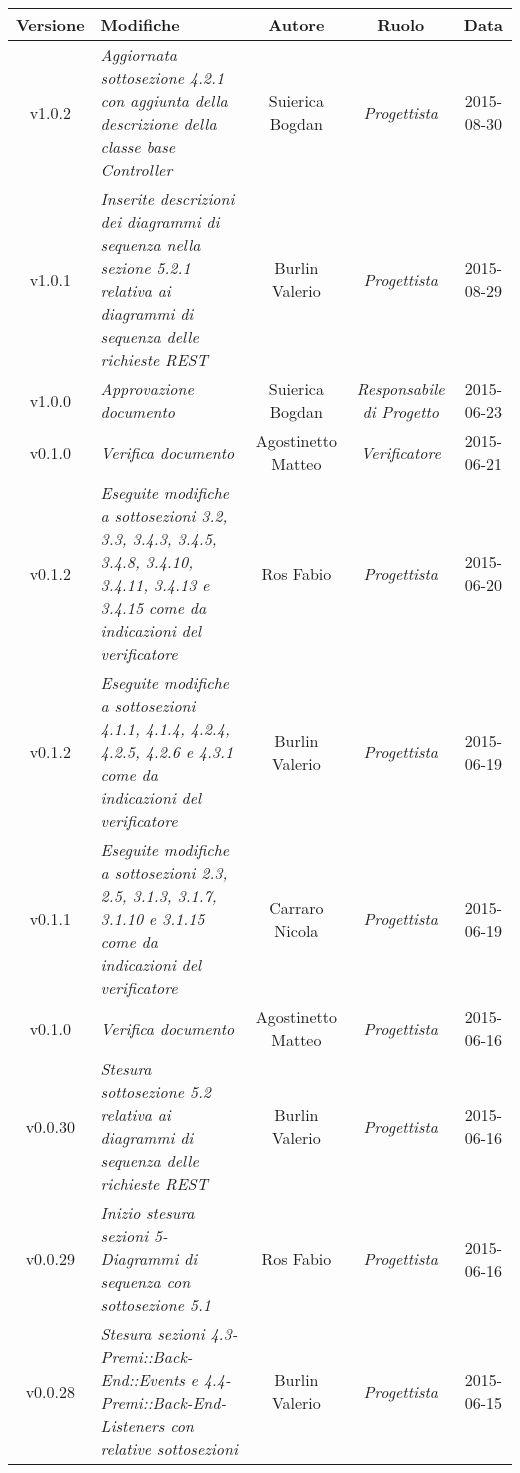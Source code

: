 \newpage

\begin{table}[h]
\centering
\begin{tabular}{|c|p{}|c|c|c|}
	\toprule
		\textbf{Versione} & \textbf{Modifiche} & \textbf{Autore} & \textbf{Ruolo} & \textbf{Data}\\
	\midrule
	\midrule
		v1.0.2 & \textit{Aggiornata sottosezione 4.2.1 con aggiunta della descrizione della classe base Controller} & Suierica Bogdan & \textit{Progettista} & 2015-08-30\\
	\midrule
		v1.0.1 & \textit{Inserite descrizioni dei diagrammi di sequenza nella sezione 5.2.1 relativa ai diagrammi di sequenza delle richieste REST} & Burlin Valerio & \textit{Progettista} & 2015-08-29\\
	\midrule
		v1.0.0 & \textit{Approvazione documento} & Suierica Bogdan & \textit{Responsabile di Progetto} & 2015-06-23\\
	\midrule
		v0.1.0 & \textit{Verifica documento} & Agostinetto Matteo & \textit{Verificatore} & 2015-06-21\\	
	\midrule
		v0.1.2 & \textit{Eseguite modifiche a sottosezioni 3.2, 3.3, 3.4.3, 3.4.5, 3.4.8, 3.4.10, 3.4.11, 3.4.13 e 3.4.15 come da indicazioni del 		verificatore} & Ros Fabio & \textit{Progettista} & 2015-06-20\\
	\midrule
		v0.1.2 & \textit{Eseguite modifiche a sottosezioni 4.1.1, 4.1.4, 4.2.4, 4.2.5, 4.2.6 e 4.3.1 come da indicazioni del verificatore} & Burlin Valerio & \textit{Progettista} & 2015-06-19\\
	\midrule
		v0.1.1 & \textit{Eseguite modifiche a sottosezioni 2.3, 2.5, 3.1.3, 3.1.7, 3.1.10 e 3.1.15 come da indicazioni del verificatore} & Carraro Nicola & \textit{Progettista} & 2015-06-19\\
	\midrule
		v0.1.0 & \textit{Verifica documento} & Agostinetto Matteo & \textit{Progettista} & 2015-06-16\\	
	\midrule
		v0.0.30 & \textit{Stesura sottosezione 5.2 relativa ai diagrammi di sequenza delle richieste REST} & Burlin Valerio & \textit{Progettista} & 2015-06-16\\
	\midrule
		v0.0.29 & \textit{Inizio stesura sezioni 5-Diagrammi di sequenza con sottosezione 5.1} & Ros Fabio & \textit{Progettista} & 2015-06-16\\
	\midrule
		v0.0.28 & \textit{Stesura sezioni 4.3-Premi::Back-End::Events e 4.4-Premi::Back-End-Listeners con relative sottosezioni } & Burlin Valerio & \textit{Progettista} & 2015-06-15\\
	\bottomrule
\end{tabular}
\end{table}

